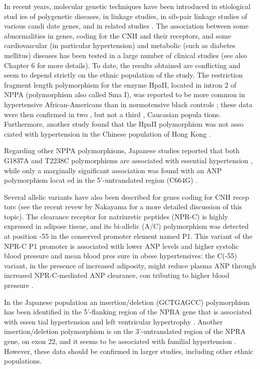 \documentclass[14pt,a4paper,onecolumn]{extarticle}
\begin{document}
In recent years, molecular genetic techniques have been introduced in etiological stud ies of polygenetic diseases, in linkage studies, in sib-pair linkage studies of various candi date genes, and in related studies \citep{251}\citep{252}. The association between some abnormalities in genes, coding for the CNH and their receptors, and some cardiovascular (in particular hypertension) and metabolic (such as diabetes mellitus) diseases has been tested in a large number of clinical studies (see also Chapter 6 for more details). To date, the results obtained are conflicting and seem to depend strictly on the ethnic population of the study.  The restriction fragment length polymorphism for the enzyme HpaII, located in intron 2 of NPPA (polymorphism also called Sma I), was reported to be more common in hypertensive African-Americans than in normotensive black controls \citep{257}; these data were then confirmed in two \citep{258}\citep{259}, but not a third \citep{260}, Caucasian popula tions. Furthermore, another study found that the HpaII polymorphism was not asso ciated with hypertension in the Chinese population of Hong Kong \citep{261}.

Regarding other NPPA polymorphisms, Japanese studies reported that both G1837A and T2238C polymorphisms are associated with essential hypertension \citep{262}, while only a marginally significant association was found with an ANP polymorphism locat ed in the 5’-untranslated region (C664G) \citep{263}.

Several allelic variants have also been described for genes coding for CNH recep tors (see the recent revew by Nakayama \citep{251} for a more detailed discussion of this topic). The clearance receptor for natriuretic peptides (NPR-C) is highly expressed in adipose tissue, and its bi-allelic (A/C) polymorphism was detected at position -55 in the conserved promoter element named P1. This variant of the NPR-C P1 promoter is associated with lower ANP levels and higher systolic blood pressure and mean blood pres sure in obese hypertensives: the C(-55) variant, in the presence of increased adiposity, might reduce plasma ANP through increased NPR-C-mediated ANP clearance, con tributing to higher blood pressure \citep{264}.

In the Japanese population an insertion/deletion (GCTGAGCC) polymorphism has been identified in the 5’-flanking region of the NPRA gene that is associated with essen tial hypertension and left ventricular hypertrophy \citep{265}. Another insertion/deletion polymorphism is on the 3’-untranslated region of the NPRA gene, on exon 22, and it seems to be associated with familial hypertension \citep{266}. However, these data should be confirmed in larger studies, including other ethnic populations.
\end{document}
